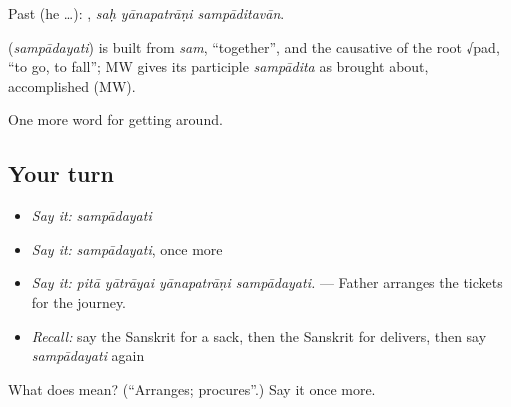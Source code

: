 Past (he …):   , \emph{saḥ yānapatrāṇi sampāditavān}.

\begin{cousinweb}
\textbf{} (\emph{sampādayati}) is built from \emph{sam}, \textquotedblleft{}together\textquotedblright{}, and the causative of the root √pad, \textquotedblleft{}to go, to fall\textquotedblright{}; MW gives its participle \emph{sampādita} as brought about, accomplished (MW).
\end{cousinweb}

\begin{grammarlens}[title={What you've built}]
One more word for getting around.
\end{grammarlens}

\subsection*{Your turn}
\begin{itemize}
\raggedright
  \item \emph{Say it:} \emph{sampādayati}
  \item \emph{Say it:} \emph{sampādayati}, once more
  \item \emph{Say it:} \emph{pitā yātrāyai yānapatrāṇi sampādayati.} — Father arranges the tickets for the journey.
  \item \emph{Recall:} say the Sanskrit for a sack, then the Sanskrit for delivers, then say \emph{sampādayati} again
\end{itemize}

\begin{tcolorbox}[breakable,colback=teal!4,colframe=teal!35!black,title={Before you move on}]
What does  mean? (\textquotedblleft{}Arranges; procures\textquotedblright{}.) Say it once more.
\end{tcolorbox}
